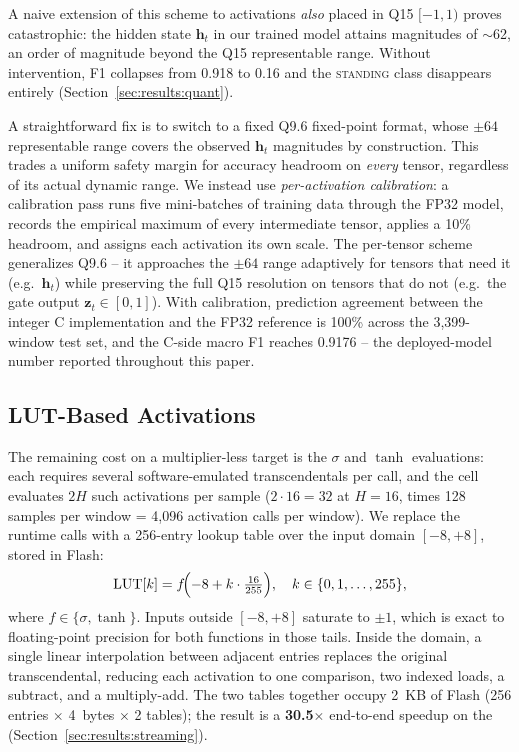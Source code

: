 A naive extension of this scheme to activations
\emph{also} placed in Q15 $[-1, 1)$ proves catastrophic: the hidden
state $\mathbf{h}_t$ in our trained model attains magnitudes of
$\sim$62, an order of magnitude beyond the Q15 representable range.
Without intervention, F1 collapses from 0.918 to 0.16 and the
\textsc{standing} class disappears entirely
(Section~\ref{sec:results:quant}).

A straightforward fix is to switch to a fixed Q9.6 fixed-point
format, whose $\pm 64$ representable range covers the observed
$\mathbf{h}_t$ magnitudes by construction. This trades a uniform
safety margin for accuracy headroom on \emph{every} tensor,
regardless of its actual dynamic range. We instead use
\emph{per-activation calibration}: a calibration pass runs five
mini-batches of training data through the FP32 model, records the
empirical maximum of every intermediate tensor, applies a 10\%
headroom, and assigns each activation its own scale. The
per-tensor scheme generalizes Q9.6 -- it approaches the $\pm 64$
range adaptively for tensors that need it (e.g.\ $\mathbf{h}_t$)
while preserving the full Q15 resolution on tensors that do not
(e.g.\ the gate output $\mathbf{z}_t \in [0,1]$). With calibration, prediction agreement
between the integer C implementation and the FP32 reference is
100\% across the 3{,}399-window test set, and the C-side
macro F1 reaches 0.9176 -- the deployed-model number reported
throughout this paper.

\subsection{LUT-Based Activations}
\label{sec:method:lut}

The remaining cost on a multiplier-less target is the
$\sigma$ and $\tanh$ evaluations: each requires several
software-emulated transcendentals per call, and the cell evaluates
$2H$ such activations per sample ($2 \cdot 16 = 32$ at $H{=}16$,
times 128 samples per window = 4{,}096 activation calls per window).
We replace the runtime calls with a 256-entry lookup table
over the input domain $[-8, +8]$, stored in Flash:
\begin{equation}
\mathrm{LUT}[k]
  = f\!\Bigl( -8 + k \cdot \tfrac{16}{255} \Bigr), \quad
  k \in \{0, 1, \ldots, 255\},
\end{equation}
where $f \in \{\sigma, \tanh\}$. Inputs outside $[-8, +8]$
saturate to $\pm 1$, which is exact to floating-point precision
for both functions in those tails. Inside the domain, a single
linear interpolation between adjacent entries replaces the original
transcendental, reducing each activation to one comparison, two
indexed loads, a subtract, and a multiply-add. The two tables
together occupy 2~KB of Flash (256 entries $\times$ 4~bytes
$\times$ 2 tables); the result is a
\textbf{30.5$\times$} end-to-end speedup on the \msp{}
(Section~\ref{sec:results:streaming}).

